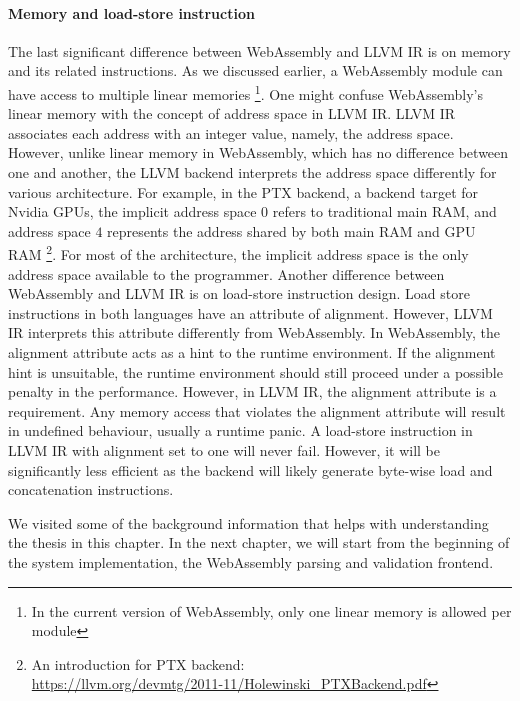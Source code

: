 \paragraph{Memory and load-store instruction}
The last significant difference between WebAssembly and LLVM IR is on memory and
its related instructions. As we discussed earlier, a WebAssembly module can have
access to multiple linear memories \footnote{In the current version of
  WebAssembly, only one linear memory is allowed per module}. One might confuse
WebAssembly's linear memory with the concept of address space in LLVM IR. LLVM
IR associates each address with an integer value, namely, the address space.
However, unlike linear memory in WebAssembly, which has no difference between
one and another, the LLVM backend interprets the address space differently for
various architecture. For example, in the PTX backend, a backend target for
Nvidia GPUs, the implicit address space $0$ refers to traditional main RAM, and
address space $4$ represents the address shared by both main RAM and GPU RAM
\footnote{An introduction for PTX backend:
  \\\url{https://llvm.org/devmtg/2011-11/Holewinski_PTXBackend.pdf}}. For most of
the architecture, the implicit address space is the only address space available
to the programmer. Another difference between WebAssembly and LLVM IR is on
load-store instruction design. Load store instructions in both languages have an
attribute of alignment. However, LLVM IR interprets this attribute differently
from WebAssembly. In WebAssembly, the alignment attribute acts as a hint to the
runtime environment. If the alignment hint is unsuitable, the runtime
environment should still proceed under a possible penalty in the performance.
However, in LLVM IR, the alignment attribute is a requirement. Any memory access
that violates the alignment attribute will result in undefined behaviour,
usually a runtime panic. A load-store instruction in LLVM IR with alignment set
to one will never fail. However, it will be significantly less efficient as the
backend will likely generate byte-wise load and concatenation instructions.

We visited some of the background information that helps with understanding the
thesis in this chapter. In the next chapter, we will start from the beginning of
the system implementation, the WebAssembly parsing and validation frontend.